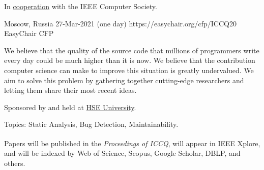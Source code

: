 \documentclass{../cfp}
\begin{document}
\PrintLogo{}



In
\href{https://conferences.ieee.org/conferences_events/conferences/conferencedetails/51190}{cooperation}
with the IEEE Computer Society.

\vspace{6pt}

\PrintAddress
  {Moscow, Russia}
  {27-Mar-2021 (one day)}
  {https://easychair.org/cfp/ICCQ20}
  {EasyChair CFP}

\vspace{12pt}
%
%
%

\vspace{6pt}

We believe that the quality of the source code that millions of programmers
write every day could be much higher than it is now. We believe that the
contribution computer science can make to improve this situation is greatly
undervalued. We aim to solve this problem by gathering
together cutting-edge researchers and letting them share their most recent ideas.

Sponsored by and held at \href{https://www.hse.ru/en/}{HSE University}.

Topics: Static Analysis, Bug Detection, Maintainability.

Papers will be published in the \textit{Proceedings of ICCQ},
will appear in IEEE Xplore\textsuperscript{\textregistered},
and will be indexed by Web of Science, Scopus, Google Scholar, DBLP, and others.
\end{document}
